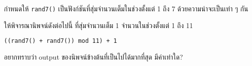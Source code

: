 \question{}

กำหนดให้ \lstinline{rand7()} เป็นฟังก์ชันที่สุ่มจำนวนเต็มในช่วงตั้งแต่ 1 ถึง 7 ด้วยความน่าจะเป็นเท่า ๆ กัน

ให้พิจารณานิพจน์ดังต่อไปนี้\hrsp%
ที่สุ่มจำนวนเต็ม 1 จำนวนในช่วงตั้งแต่ 1 ถึง 11
\begin{center}
    \lstinline{((rand7() + rand7()) mod 11) + 1}
\end{center}

อยากทราบว่า output ของนิพจน์ข้างต้นที่เป็นไปได้มากที่สุด มีค่าเท่าใด?
